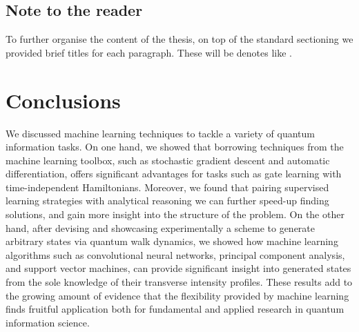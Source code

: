 \documentclass[12pt,twoside]{report}
\begin{document}
\section*{Note to the reader}
To further organise the content of the thesis, on top of the standard sectioning we provided brief titles for each paragraph. These will be denotes like .



% 

% 



% 

\chapter{Conclusions}
We discussed machine learning techniques to tackle a variety of quantum information tasks.
On one hand, we showed that borrowing techniques from the machine learning toolbox, such as stochastic gradient descent and automatic differentiation, offers significant advantages for tasks such as gate learning with time-independent Hamiltonians.
Moreover, we found that pairing supervised learning strategies with analytical reasoning we can further speed-up finding solutions, and gain more insight into the structure of the problem.
On the other hand, after devising and showcasing experimentally a scheme to generate arbitrary states via quantum walk dynamics, we showed how machine learning algorithms such as convolutional neural networks, principal component analysis, and support vector machines, can provide significant insight into generated states from the sole knowledge of their transverse intensity profiles.
These results add to the growing amount of evidence that the flexibility provided by machine learning finds fruitful application both for fundamental and applied research in quantum information science.



\end{document}
